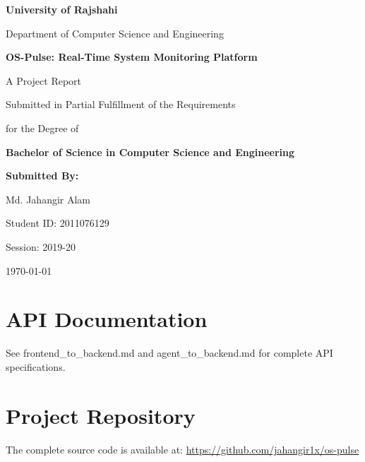 \documentclass[12pt,a4paper]{report}
\begin{document}
\begin{titlepage}
    \centering
    \vspace*{1cm}
    
    {\LARGE\bfseries University of Rajshahi\par}
    \vspace{0.5cm}
    {\large Department of Computer Science and Engineering\par}
    \vspace{2cm}
    
    {\Huge\bfseries OS-Pulse: Real-Time System Monitoring Platform\par}
    \vspace{1.5cm}
    
    {\Large A Project Report\par}
    \vspace{0.5cm}
    {\large Submitted in Partial Fulfillment of the Requirements\par}
    {\large for the Degree of\par}
    \vspace{0.5cm}
    {\Large\bfseries Bachelor of Science in Computer Science and Engineering\par}
    \vspace{2cm}
    
    {\large\bfseries Submitted By:\par}
    \vspace{0.3cm}
    {\large Md. Jahangir Alam\par}
    {\large Student ID: 2011076129\par}
    {\large Session: 2019-20\par}
    \vspace{2cm}
    
    {\large\today\par}
\end{titlepage}




\tableofcontents













\appendix
\chapter{API Documentation}
See frontend\_to\_backend.md and agent\_to\_backend.md for complete API specifications.

\chapter{Project Repository}
The complete source code is available at: \url{https://github.com/jahangir1x/os-pulse}
\end{document}
